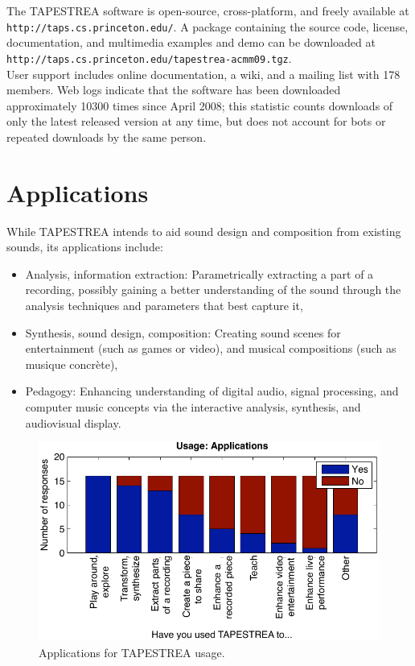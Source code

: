 \documentclass{sig-alt-release2}
\begin{document}
The TAPESTREA software is open-source, cross-platform, and freely available at \texttt{http://taps.cs.princeton.edu/}. A package containing the source code, license, documentation, and multimedia examples and demo can be downloaded at
\texttt{http://taps.cs.princeton.edu/tapestrea-acmm09.tgz}.\\
User support includes online documentation, a wiki, and a mailing list with 178 members. Web logs indicate that the software has been downloaded approximately 10300 times since April 2008; this statistic counts downloads of only the latest released version at any time, but does not account for bots or repeated downloads by the same person.

\section{Applications}

While TAPESTREA intends to aid sound design and composition from existing sounds, its applications include:
\begin{itemize}
\setlength\itemsep{-3pt}
\item Analysis, information extraction: Parametrically extracting a part of a recording, possibly gaining a better understanding of the sound through the analysis techniques and parameters that best capture it,
\item Synthesis, sound design, composition: Creating sound scenes for entertainment (such as games or video), and musical compositions (such as musique concr\`ete),
\item Pedagogy: Enhancing understanding of digital audio, signal processing, and computer music concepts via the interactive analysis, synthesis, and audiovisual display.
\end{itemize}

\begin{figure}[h]
\centering
\includegraphics[width=\columnwidth]{usage_applications.pdf} %
\caption{Applications for TAPESTREA usage.}
\label{fig:usage_applications}
\end{figure}
\end{document}
